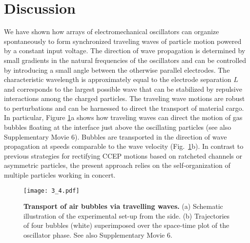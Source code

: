 \section{Discussion}

We have shown how arrays of electromechanical oscillators can organize spontaneously to form synchronized traveling waves of particle motion powered by a constant input voltage.  The direction of wave propagation is determined by small gradients in the natural frequencies of the oscillators and can be controlled by introducing a small angle between the otherwise parallel electrodes.  The characteristic wavelength is approximately equal to the electrode separation $L$ and corresponds to the largest possible wave that can be stabilized by repulsive interactions among the charged particles.  The traveling wave motions are robust to perturbations and can be harnessed to direct the transport of material cargo.  In particular, Figure \ref{fig:5}a shows how traveling waves can direct the motion of gas bubbles floating at the interface just above the oscillating particles (see also Supplementary Movie 6).  Bubbles are transported in the direction of wave propagation at speeds comparable to the wave velocity (Fig.~\ref{fig:5}b). In contrast to previous strategies for rectifying CCEP motions based on ratcheted channels\autocite{drews2013ratcheted} or asymmetric particles\autocite{Dou2016}, the present approach relies on the self-organization of multiple particles working in concert. 

\begin{figure}[h]
    \centering
    \texttt{[image: 3\_4.pdf]}
    \caption{
    \textbf{Transport of air bubbles via travelling waves.} (a) Schematic illustration of the experimental set-up from the side. (b) Trajectories of four bubbles (white) superimposed over the space-time plot of the oscillator phase. See also Supplementary Movie 6.}
    \label{fig:5}
\end{figure}

